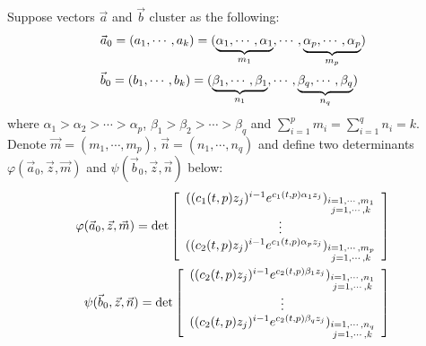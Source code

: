 Suppose vectors $\vec{a}$ and $\vec{b}$ cluster as the following:
\begin{align}{\label{Block}}
\begin{split}
	&\vec{a}_{0}=(a_{1},\cdots,a_{k})=(\underbrace{\alpha_{1},\cdots,\alpha_{1}}_{m_{1}},\cdots,\underbrace{\alpha_{p},\cdots,\alpha_{p}}_{m_{p}})\\
	&\vec{b}_{0}=(b_{1},\cdots,b_{k})=(\underbrace{\beta_{1},\cdots,\beta_{1}}_{n_{1}},\cdots,\underbrace{\beta_{q},\cdots,\beta_{q}}_{n_{q}})
\end{split}
\end{align}
where $\alpha_{1}>\alpha_{2}>\cdots>\alpha_{p}$, $\beta_{1}>\beta_{2}>\cdots>\beta_{q}$ and $\sum_{i=1}^{p}m_{i}=\sum_{i=1}^{q}n_{i}=k$. Denote $\vec{m}=(m_{1},\cdots,m_{p})$, $\vec{n}=(n_{1},\cdots,n_{q})$ and define two determinants $\varphi(\vec{a}_{0},\vec{z},\vec{m})$ and $\psi(\vec{b}_{0},\vec{z},\vec{n})$ below:
\begin{equation}{\label{TwoDet}}
\begin{split}
	\varphi(\vec{a}_{0},\vec{z},\vec{m})= \det
	\left[ \begin{array}{ccc}
		((c_{1}(t,p)z_{j})^{i-1}e^{c_{1}(t,p)\alpha_{1}z_{j}})_{\substack{i=1,\cdots,m_{1}\\j=1,\cdots,k}}\\
	\vdots\\
	((c_{2}(t,p)z_{j})^{i-1}e^{c_{1}(t,p)\alpha_{p}z_{j}})_{\substack{i=1,\cdots,m_{p} \\j=1,\cdots,k}}
	\end{array}
	\right]
\\
	\psi(\vec{b}_{0},\vec{z},\vec{n})= \det
	\left[ \begin{array}{ccc}
		((c_{2}(t,p)z_{j})^{i-1}e^{c_{2}(t,p)\beta_{1}z_{j}})_{\substack{i=1,\cdots,n_{1}\\j=1,\cdots,k}}\\
	\vdots\\
	((c_{2}(t,p)z_{j})^{i-1}e^{c_{2}(t,p)\beta_{q}z_{j}})_{\substack{i=1,\cdots, n_{q} \\j=1,\cdots,k}}
	\end{array}
	\right]
\end{split}
\end{equation}

